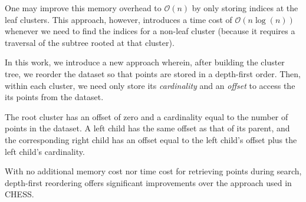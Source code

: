 One may improve this memory overhead to $\mathcal{O}(n)$ by only storing indices at the leaf clusters.
This approach, however, introduces a time cost of $\mathcal{O}(n\log(n))$ whenever we need to find the indices for a non-leaf cluster (because it requires a traversal of the subtree rooted at that cluster).

In this work, we introduce a new approach wherein, after building the cluster tree, we reorder the dataset so that points are stored in a depth-first order.
Then, within each cluster, we need only store its \emph{cardinality} and an \emph{offset} to access the its points from the dataset.

The root cluster has an offset of zero and a cardinality equal to the number of points in the dataset.
A left child has the same offset as that of its parent, and the corresponding right child has an offset equal to the left child's offset plus the left child's cardinality.

With no additional memory cost nor time cost for retrieving points during search, depth-first reordering offers significant improvements over the approach used in CHESS.





